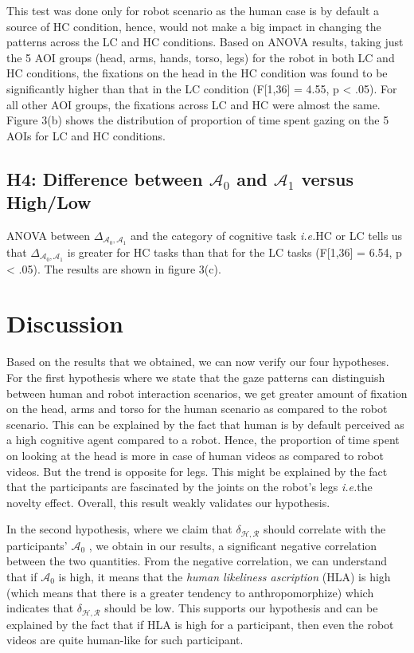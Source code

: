 \documentclass[a4,twocolumn,10pt]{article}
\newcommand{\ie}{{\textit{i.e.\xspace}}}
\newcommand{\anti}{{$\mathcal{A}_0$ }}
\newcommand{\antf}{{$\mathcal{A}_1$ }}
\newcommand{\deltaant}{{ $\Delta_{\mathcal{A}_0,\mathcal{A}_1}$ }}
\begin{document}
This test was done only for robot scenario as the human case is
by default a source of HC condition, hence, would not make a big impact in
changing the patterns across the LC and HC conditions. Based on ANOVA results,
taking just the 5 AOI groups (head, arms, hands, torso, legs) for the robot in
both LC and HC conditions, the fixations on the head in the HC condition was
found to be significantly higher than that in the LC condition (F[1,36] = 4.55,
p < .05). For all other AOI groups, the fixations across LC and HC were almost
the same. Figure 3(b) shows the distribution of proportion of time spent gazing
on the 5 AOIs for LC and HC conditions.

\subsection{H4: Difference between \anti and \antf versus High/Low}

ANOVA between \deltaant and the category of cognitive task
\ie HC or LC tells us that \deltaant is greater for HC tasks
than that for the LC tasks (F[1,36] = 6.54, p < .05). The results are shown in
figure 3(c).


\section{Discussion}

Based on the results that we obtained, we can now verify our four hypotheses.
For the first hypothesis where we state that the gaze patterns can distinguish
between human and robot interaction scenarios, we get greater
amount of fixation on the head, arms and torso for the human scenario as
compared to the robot scenario. This can be explained by the fact that
human is by default perceived as a high cognitive agent compared to a robot.
Hence, the proportion of time spent on looking at the head is more in case of
human videos as compared to robot videos. But the trend is opposite for legs.
This might be explained by the fact that the participants are fascinated by the
joints on the robot's legs \ie the novelty effect. Overall, this
result weakly validates our hypothesis.

In the second hypothesis, where we claim that $\delta_{\mathcal{H},\mathcal{R}}$
should correlate with the participants' \anti, we obtain in our results, a
significant negative correlation between the two quantities. From the negative
correlation, we can understand that if \anti is high, it means that the
\textit{human likeliness ascription} (HLA) is high (which means that there is a
greater tendency to anthropomorphize) which indicates that
$\delta_{\mathcal{H},\mathcal{R}}$ should be low. This supports our hypothesis
and can be explained by the fact that if HLA is high for a participant, then
even the robot videos are quite human-like for such participant. 
\end{document}
